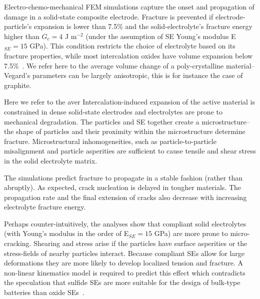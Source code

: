 \documentclass[final,5p,sort&compress]{elsarticle}
\begin{document}
%
Electro-chemo-mechanical FEM simulations capture the onset and propagation of damage in a solid-state composite electrode.
Fracture is prevented if electrode-particle's expansion is lower than 7.5\% and the solid-electrolyte's fracture energy higher than $G_c = 4$ J m$^{-2}$ (under the assumption of SE Young's modulus E$_{SE} = 15$ GPa). 
%
This condition restricts the choice of electrolyte based on its fracture properties, 
while most intercalation oxides  
have volume expansion below 7.5\%~\cite{woodford:thesis}. 
We refer here to the average volume change of a poly-crystalline material--Vegard's parameters can be largely anisotropic, this is for instance the case of graphite. 

Here we refer to the aver
%
Intercalation-induced expansion of the active material is constrained in dense solid-state electrodes and  electrolytes are prone to
mechanical degradation. 
The particles and SE together create a microstructure--the shape of particles and their proximity within the microstructure determine fracture.
%
Microstructural inhomogeneities, such as particle-to-particle misalignment and particle asperities are sufficient to cause tensile and shear stress in the solid electrolyte matrix.

The simulations predict fracture to propagate in a stable fashion (rather than abruptly).
As expected, crack nucleation is delayed in tougher materials. The propagation rate and the final extension of cracks also decrease with increasing electrolyte fracture energy. 

Perhaps counter-intuitively, the analyses show that 
compliant solid electrolytes (with Young's modulus in the order of E$_{SE} = 15$ GPa) are more prone to micro-cracking. 
Shearing and stress arise 
if the particles have surface asperities
or the stress-fields of nearby particles interact.
Because compliant SEs allow for large deformations
they are more likely to develop localized tension and  fracture.
A non-linear kinematics model is required to predict this effect
which contradicts the speculation that sulfide SEs are more suitable
for the design of bulk-type batteries than oxide SEs~\cite{Sakuda2013}.
\end{document}
